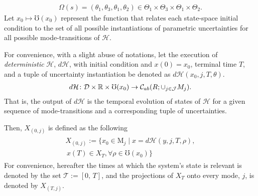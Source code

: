 \begin{align*}
\Omega(s)=(\theta_1,\theta_3,\theta_1,\theta_2)\in \Theta_1\times \Theta_3\times \Theta_1\times \Theta_2.
\end{align*}
Let $x_0\mapsto \mho(x_0)$ represent the function that relates each state-space initial condition to the set of all possible instantiations of parametric uncertainties for all possible mode-transitions of $\mathcal H$.
\par
For convenience, with a slight abuse of notations, let the execution of \emph{deterministic} $\mathcal H$, $d\mathcal H$, with initial condition and $x(0)=x_0$, terminal time $T$, and a tuple of uncertainty instantiation be denoted as $d\mathcal H(x_0,j,T,\theta)$.
\begin{align}
    d\mathcal H\colon \mathcal D\times \mathbb{R}\times \mho(x_0)\rightarrow \mathcal C_{ab}(R;\cup_{j\in \mathcal J} M_j).
\end{align}
That is, the output of $d\mathcal H$ is the temporal evolution of states of $\mathcal H$ for a given sequence of mode-transitions and a corresponding tuple of uncertainties.
\par
Then, $X_{(0,j)}$ is defined as the following
\begin{align}
\begin{aligned}
     X_{(0,j)}:=\{x_0\in \mathrm M_j\mid x=d\mathcal H(y,j,T,\rho),\\\,x(T)\in X_T,\forall \rho\in \mho(x_0) \}
\end{aligned}
\end{align}
For convenience, hereafter the times at which the system's state is relevant is denoted by the set $\mathcal T:=[0,\,T]$, and the projections of $X_T$ onto every mode, $j$, is denoted by $X_{(T,j)}$.
